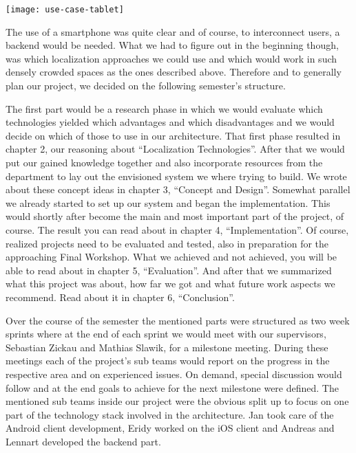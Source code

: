 \begin{center}
    \texttt{[image: use-case-tablet]}\\
\end{center}

The use of a smartphone was quite clear and of course, to interconnect users, a backend would be needed. What we had to figure out in the beginning though, was which localization approaches we could use and which would work in such densely crowded spaces as the ones described above. Therefore and to generally plan our project, we decided on the following semester's structure.

The first part would be a research phase in which we would evaluate which technologies yielded which advantages and which disadvantages and we would decide on which of those to use in our architecture. That first phase resulted in chapter 2, our reasoning about \enquote{Localization Technologies}. After that we would put our gained knowledge together and also incorporate resources from the department to lay out the envisioned system we where trying to build. We wrote about these concept ideas in chapter 3, \enquote{Concept and Design}. Somewhat parallel we already started to set up our system and began the implementation. This would shortly after become the main and most important part of the project, of course. The result you can read about in chapter 4, \enquote{Implementation}. Of course, realized projects need to be evaluated and tested, also in preparation for the approaching Final Workshop. What we achieved and not achieved, you will be able to read about in chapter 5, \enquote{Evaluation}. And after that we summarized what this project was about, how far we got and what future work aspects we recommend. Read about it in chapter 6, \enquote{Conclusion}.

Over the course of the semester the mentioned parts were structured as two week sprints where at the end of each sprint we would meet with our supervisors, Sebastian Zickau and Mathias Slawik, for a milestone meeting. During these meetings each of the project's sub teams would report on the progress in the respective area and on experienced issues. On demand, special discussion would follow and at the end goals to achieve for the next milestone were defined. The mentioned sub teams inside our project were the obvious split up to focus on one part of the technology stack involved in the architecture. Jan took care of the Android client development, Eridy worked on the iOS client and Andreas and Lennart developed the backend part.


